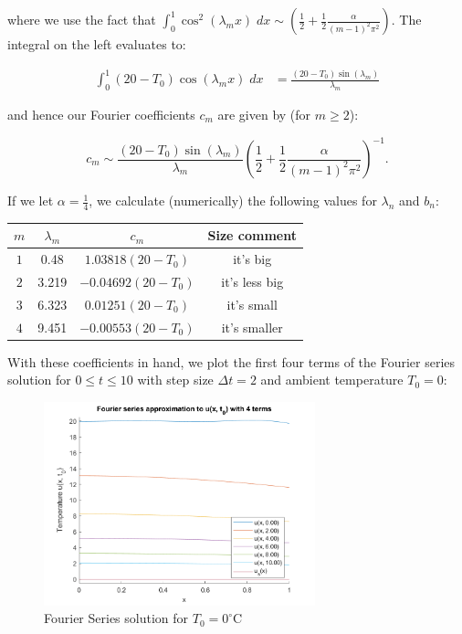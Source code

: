 \begin{solution}
    where we use the fact that $\int_{0}^{1}{\cos^2{(\lambda_m x)}\; dx} \sim \left(\frac{1}{2} + \frac{1}{2}\frac{\alpha}{(m-1)^2 \pi^2} \right)$.
    The integral on the left evaluates to:

    \begin{align*}
        \int_{0}^{1}{(20 - T_0) \cos{(\lambda_m x)}\; dx} &= \frac{(20 - T_0) \sin{(\lambda_m)}}{\lambda_m}
    \end{align*}

    and hence our Fourier coefficients $c_m$ are given by (for $m \ge 2$):

    $$
        c_m \sim \frac{(20 - T_0) \sin{(\lambda_m)}}{\lambda_m} \left(\frac{1}{2} + \frac{1}{2}\frac{\alpha}{(m-1)^2 \pi^2} \right)^{-1}.
    $$

    If we let $\alpha = \frac{1}{4}$, we calculate (numerically) the following values for $\lambda_n$ and $b_n$: 

    \begin{center}
        \begin{tabular}{ ||c c c c|| } 
            \hline
            $m$ & $\lambda_m$ & $c_m$ & Size comment  \\ [0.5ex] 
            \hline\hline
            $1$ & 0.48        & $1.03818 (20 - T_0)$  & it's big \\ 
            \hline
            $2$ & 3.219       & $-0.04692 (20 - T_0)$ & it's less big \\ 
            \hline
            $3$ & 6.323       & $0.01251 (20 - T_0)$  & it's small \\ 
            \hline
            $4$ & 9.451       & $-0.00553 (20 - T_0)$ & it's smaller \\ [1ex]
        \hline
        \end{tabular}
    \end{center}

    \pagebreak
    With these coefficients in hand, we plot the first four terms of the Fourier series solution for $0 \le t \le 10$
    with step size $\Delta t = 2$ and ambient temperature $T_0 = 0$:

    \begin{figure}[h]
        \centering
        \includegraphics[width=0.7\textwidth]{problem1_fourier_series_solution_4_terms_t0_0.png}
        \caption{Fourier Series solution for $T_0 = 0^{\circ}$C}
    \end{figure}


\end{solution}
